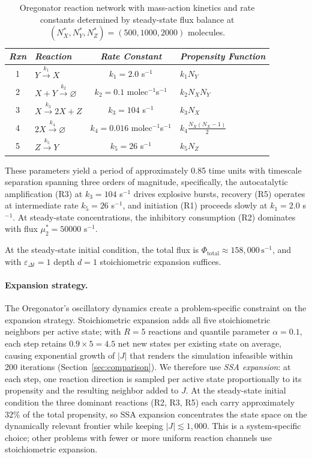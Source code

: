 \documentclass[onefignum,onetabnum]{siamart171218}
\begin{document}
\begin{table}[!htbp]
\centering
\caption{Oregonator reaction network with mass-action kinetics and rate constants determined by steady-state flux balance at $(N_X^*, N_Y^*, N_Z^*) = (500, 1000, 2000)$ molecules.}
\label{table:oregonator}
\begin{tabular}{|c|l|c|l|}
\hline
\textit{Rxn} & \textit{Reaction} & \textit{Rate Constant} & \textit{Propensity Function}\\
\hline
1 & $Y \xrightarrow{k_1} X$ & $k_1 = 2.0$ s$^{-1}$ & $k_1 N_Y$ \\
2 & $X + Y \xrightarrow{k_2} \varnothing$ & $k_2 = 0.1$ molec$^{-1}$s$^{-1}$ & $k_2 N_X N_Y$ \\
3 & $X \xrightarrow{k_3} 2X + Z$ & $k_3 = 104$ s$^{-1}$ & $k_3 N_X$ \\
4 & $2X \xrightarrow{k_4} \varnothing$ & $k_4 = 0.016$ molec$^{-1}$s$^{-1}$ & $k_4 \frac{N_X(N_X-1)}{2}$ \\
5 & $Z \xrightarrow{k_5} Y$ & $k_5 = 26$ s$^{-1}$ & $k_5 N_Z$ \\
\hline
\end{tabular}
\end{table}

These parameters yield a period of approximately 0.85 time units with timescale separation spanning three orders of magnitude, specifically, the autocatalytic amplification (R3) at $k_3 = 104$ s$^{-1}$ drives explosive bursts, recovery (R5) operates at intermediate rate $k_5 = 26$ s$^{-1}$, and initiation (R1) proceeds slowly at $k_1 = 2.0$ s$^{-1}$. At steady-state concentrations, the inhibitory consumption (R2) dominates with flux $\mu_2^* = 50000$ s$^{-1}$.

At the steady-state initial condition, the total flux is $\Phi_{\mathrm{total}} \approx 158{,}000\,\text{s}^{-1}$, and with $\varepsilon_{\Delta t} = 1$ depth $d=1$ stoichiometric expansion suffices.

\paragraph{Expansion strategy.}
The Oregonator's oscillatory dynamics create a problem-specific constraint on the expansion strategy.  Stoichiometric expansion adds all five stoichiometric neighbors per active state; with $R = 5$ reactions and quantile parameter $\alpha = 0.1$, each step retains $0.9 \times 5 = 4.5$ net new states per existing state on average, causing exponential growth of $|J|$ that renders the simulation infeasible within 200 iterations (Section~\ref{sec:comparison}).  We therefore use \emph{SSA expansion}: at each step, one reaction direction is sampled per active state proportionally to its propensity and the resulting neighbor added to $J$.  At the steady-state initial condition the three dominant reactions (R2, R3, R5) each carry approximately $32\%$ of the total propensity, so SSA expansion concentrates the state space on the dynamically relevant frontier while keeping $|J| \lesssim 1{,}000$.  This is a system-specific choice; other problems with fewer or more uniform reaction channels use stoichiometric expansion.
\end{document}
